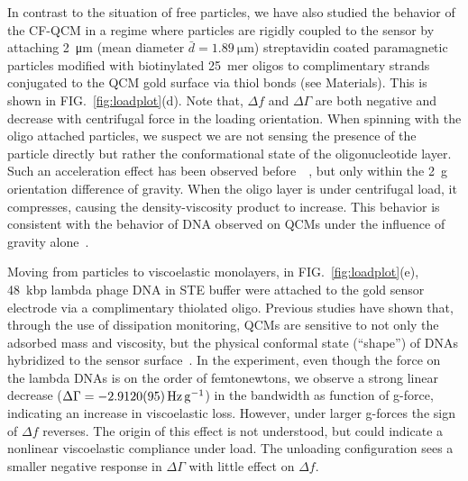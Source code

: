 \documentclass[floatfix,superscriptaddress,a4paper,twocolumn]{revtex4-1}
\newcommand{\Figure}[1]{FIG.~\ref{#1}}
\newcommand{\df}{\Delta\!f}
\newcommand{\dg}{\Delta\Gamma}
\begin{document}
In contrast to the situation of free particles, we have also studied the
behavior of the CF-QCM in a regime where particles are rigidly coupled to
the sensor by attaching \SI{2}{\micro\meter} (mean diameter
$\bar{d}=\SI{1.89}{\micro\meter}$) streptavidin coated paramagnetic
particles modified with biotinylated \SI{25}{mer} oligos to complimentary
strands conjugated to the QCM gold surface via thiol bonds (see
Materials).  This is shown in \Figure{fig:loadplot}(d).  Note
that, $\df$ and $\dg$ are both negative and decrease
with centrifugal force in the loading orientation.  
When spinning with the oligo attached
particles, we suspect we are not sensing the presence of the particle
directly but rather the conformational state of the oligonucleotide layer.
Such an acceleration effect has been observed
before~\cite{yoshimoto2002effect}~\cite{fawcett2004evidence}, but only
within the \SI{2}{g} orientation difference of gravity.  When the oligo
layer is under centrifugal load, it compresses, causing the
density-viscosity product to increase.  This behavior is consistent with
the behavior of DNA observed on QCMs under the influence of gravity
alone~\cite{fawcett2004evidence}.

Moving from particles to viscoelastic monolayers, in
\Figure{fig:loadplot}(e), \SI{48}{kbp} lambda phage DNA in STE buffer were
attached to the gold sensor electrode via a complimentary thiolated oligo.  Previous studies have shown that,
through the use of dissipation monitoring, QCMs are sensitive to not only
the adsorbed mass and viscosity, but the physical conformal state
(``shape'') of DNAs hybridized to the sensor
surface~\cite{tsortos2008shear}.  In the experiment, even though the force
on the lambda DNAs is on the order of femtonewtons, we observe a strong
linear decrease ($\dg=\SI{-2.912+-0.0095}{\hertz\per\g}$) in the
bandwidth as function of g-force, indicating an
increase in viscoelastic loss.  However, under larger g-forces the sign of
$\df$ reverses.  The origin of this effect is not understood, but
could indicate a nonlinear viscoelastic compliance under load.  The
unloading configuration sees a smaller negative response in $\dg$ with little
effect on $\df$.
\end{document}
